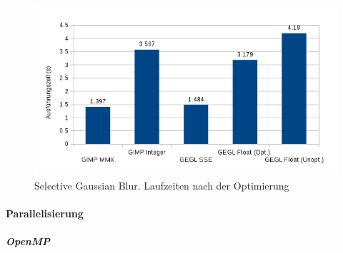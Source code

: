 \begin{figure}
\centering
\includegraphics[scale=0.75]{graphs/sgb-graph-2.png}
\caption{Selective Gaussian Blur. Laufzeiten nach der Optimierung}
\label{fig:sgb-graph-2}
\end{figure} 
 

\paragraph{Parallelisierung}
\subparagraph{OpenMP}